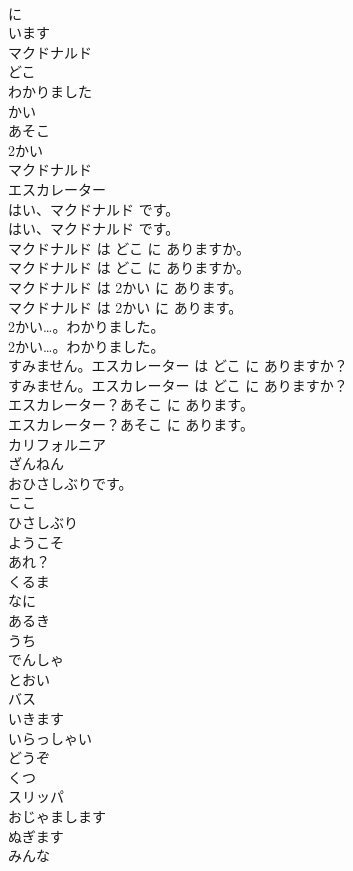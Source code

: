 \documentclass[8pt]{extreport}
\begin{document}
\begin{CJK}{UTF8}{min}
\\	に
\\	います
\\	マクドナルド
\\	どこ
\\	わかりました
\\	かい
\\	あそこ
\\	2かい
\\	マクドナルド
\\	エスカレーター
\\	はい、マクドナルド です。	
\\	はい、マクドナルド です。 
\\	マクドナルド は どこ に ありますか。	
\\	マクドナルド は どこ に ありますか。 
\\	マクドナルド は 2かい に あります。	
\\	マクドナルド は 2かい に あります。 
\\	2かい…。わかりました。	
\\	2かい…。わかりました。 
\\	すみません。エスカレーター は どこ に ありますか？	
\\	すみません。エスカレーター は どこ に ありますか？ 
\\	エスカレーター？あそこ に あります。	
\\	エスカレーター？あそこ に あります。 
\\	カリフォルニア
\\	ざんねん
\\	おひさしぶりです。
\\	ここ
\\	ひさしぶり
\\	ようこそ
\\	あれ？
\\	くるま
\\	なに
\\	あるき
\\	うち
\\	でんしゃ
\\	とおい
\\	バス
\\	いきます
\\	いらっしゃい
\\	どうぞ
\\	くつ
\\	スリッパ
\\	おじゃまします
\\	ぬぎます
\\	みんな

\end{CJK}
\end{document}
